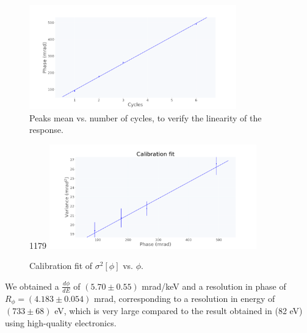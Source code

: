 \documentclass[12pt]{article}
\begin{document}
\begin{figure}[H]
\centering
\includegraphics[width=0.8\textwidth]{calib_cycles_vs_phase.png}
\caption{Peaks mean vs. number of cycles, to verify the linearity of the response.}
\end{figure}
\begin{figure}[H]1179 
\centering
\includegraphics[width=0.8\textwidth]{calib_fit.png}
\caption{Calibration fit of $\sigma^2[\phi]$ vs. $\phi$.}
\end{figure}
We obtained a $\frac{d \phi}{dE}$ of $( 5.70 \pm 0.55)$ mrad/keV and a resolution in phase of $R_\phi = (4.183 \pm 0.054)$ mrad, corresponding to a resolution in energy of $(733 \pm 68)$ eV, which is very large compared to the result obtained in \cite{Cardani} (82 eV) using high-quality electronics.
\end{document}
